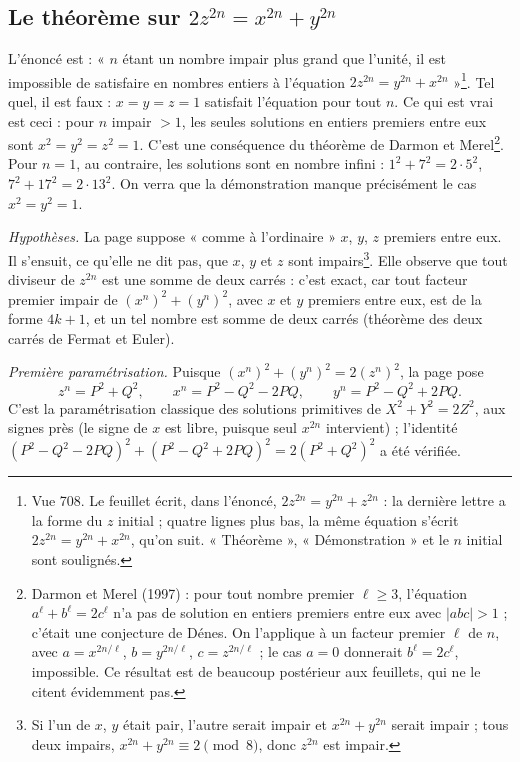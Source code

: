 \documentclass[11pt,a4paper]{article}
\begin{document}
\subsection*{Le théorème sur $2z^{2n} = x^{2n} + y^{2n}$}

L'énoncé est : « $n$ étant un nombre impair plus grand que l'unité, il est impossible de satisfaire en nombres entiers à l'équation $2z^{2n}=y^{2n}+x^{2n}$ »\footnote{Vue 708. Le feuillet écrit, dans l'énoncé, $2z^{2n}=y^{2n}+z^{2n}$ : la dernière lettre a la forme du $z$ initial ; quatre lignes plus bas, la même équation s'écrit $2z^{2n}=y^{2n}+x^{2n}$, qu'on suit. « Théorème », « Démonstration » et le $n$ initial sont soulignés.}. Tel quel, il est faux : $x=y=z=1$ satisfait l'équation pour tout $n$. Ce qui est vrai est ceci : pour $n$ impair $>1$, les seules solutions en entiers premiers entre eux sont $x^2=y^2=z^2=1$. C'est une conséquence du théorème de Darmon et Merel\footnote{Darmon et Merel (1997) : pour tout nombre premier $\ell\ge 3$, l'équation $a^\ell+b^\ell=2c^\ell$ n'a pas de solution en entiers premiers entre eux avec $|abc|>1$ ; c'était une conjecture de Dénes. On l'applique à un facteur premier $\ell$ de $n$, avec $a=x^{2n/\ell}$, $b=y^{2n/\ell}$, $c=z^{2n/\ell}$ ; le cas $a=0$ donnerait $b^\ell=2c^\ell$, impossible. Ce résultat est de beaucoup postérieur aux feuillets, qui ne le citent évidemment pas.}. Pour $n=1$, au contraire, les solutions sont en nombre infini : $1^2+7^2=2\cdot 5^2$, $7^2+17^2=2\cdot 13^2$. On verra que la démonstration manque précisément le cas $x^2=y^2=1$.

\emph{Hypothèses.} La page suppose « comme à l'ordinaire » $x$, $y$, $z$ premiers entre eux. Il s'ensuit, ce qu'elle ne dit pas, que $x$, $y$ et $z$ sont impairs\footnote{Si l'un de $x$, $y$ était pair, l'autre serait impair et $x^{2n}+y^{2n}$ serait impair ; tous deux impairs, $x^{2n}+y^{2n}\equiv 2 \pmod 8$, donc $z^{2n}$ est impair.}. Elle observe que tout diviseur de $z^{2n}$ est une somme de deux carrés : c'est exact, car tout facteur premier impair de $(x^n)^2+(y^n)^2$, avec $x$ et $y$ premiers entre eux, est de la forme $4k+1$, et un tel nombre est somme de deux carrés (théorème des deux carrés de Fermat et Euler).

\emph{Première paramétrisation.} Puisque $(x^n)^2+(y^n)^2=2(z^n)^2$, la page pose
\[ z^n=P^2+Q^2,\qquad x^n=P^2-Q^2-2PQ,\qquad y^n=P^2-Q^2+2PQ. \]
C'est la paramétrisation classique des solutions primitives de $X^2+Y^2=2Z^2$, aux signes près (le signe de $x$ est libre, puisque seul $x^{2n}$ intervient) ; l'identité $(P^2-Q^2-2PQ)^2+(P^2-Q^2+2PQ)^2=2(P^2+Q^2)^2$ a été vérifiée.
\end{document}
